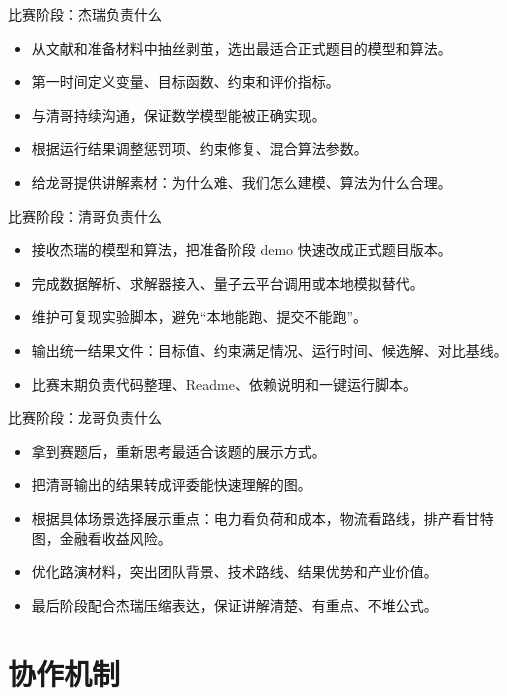 \documentclass[aspectratio=169]{beamer}
\begin{document}
\begin{frame}{比赛阶段：杰瑞负责什么}
\small
\begin{itemize}
  \item 从文献和准备材料中抽丝剥茧，选出最适合正式题目的模型和算法。
  \item 第一时间定义变量、目标函数、约束和评价指标。
  \item 与清哥持续沟通，保证数学模型能被正确实现。
  \item 根据运行结果调整惩罚项、约束修复、混合算法参数。
  \item 给龙哥提供讲解素材：为什么难、我们怎么建模、算法为什么合理。
\end{itemize}
\end{frame}

\begin{frame}{比赛阶段：清哥负责什么}
\small
\begin{itemize}
  \item 接收杰瑞的模型和算法，把准备阶段 demo 快速改成正式题目版本。
  \item 完成数据解析、求解器接入、量子云平台调用或本地模拟替代。
  \item 维护可复现实验脚本，避免“本地能跑、提交不能跑”。
  \item 输出统一结果文件：目标值、约束满足情况、运行时间、候选解、对比基线。
  \item 比赛末期负责代码整理、Readme、依赖说明和一键运行脚本。
\end{itemize}
\end{frame}

\begin{frame}{比赛阶段：龙哥负责什么}
\small
\begin{itemize}
  \item 拿到赛题后，重新思考最适合该题的展示方式。
  \item 把清哥输出的结果转成评委能快速理解的图。
  \item 根据具体场景选择展示重点：电力看负荷和成本，物流看路线，排产看甘特图，金融看收益风险。
  \item 优化路演材料，突出团队背景、技术路线、结果优势和产业价值。
  \item 最后阶段配合杰瑞压缩表达，保证讲解清楚、有重点、不堆公式。
\end{itemize}
\end{frame}

\section{协作机制}
\end{document}

